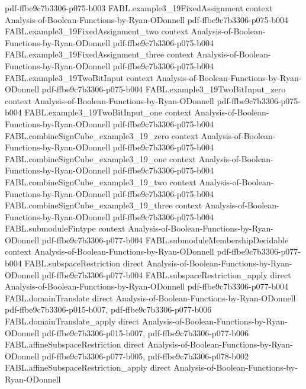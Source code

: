 \begin{theorem}
  {pdf-ffbe9c7b3306-p075-b003}
\proofstep
  {FABL.example3_19FixedAssignment}
  {context}
  {Analysis-of-Boolean-Functions-by-Ryan-ODonnell}
  {pdf-ffbe9c7b3306-p075-b004}
\proofstep
  {FABL.example3_19FixedAssignment_two}
  {context}
  {Analysis-of-Boolean-Functions-by-Ryan-ODonnell}
  {pdf-ffbe9c7b3306-p075-b004}
\proofstep
  {FABL.example3_19FixedAssignment_three}
  {context}
  {Analysis-of-Boolean-Functions-by-Ryan-ODonnell}
  {pdf-ffbe9c7b3306-p075-b004}
\proofstep
  {FABL.example3_19TwoBitInput}
  {context}
  {Analysis-of-Boolean-Functions-by-Ryan-ODonnell}
  {pdf-ffbe9c7b3306-p075-b004}
\proofstep
  {FABL.example3_19TwoBitInput_zero}
  {context}
  {Analysis-of-Boolean-Functions-by-Ryan-ODonnell}
  {pdf-ffbe9c7b3306-p075-b004}
\proofstep
  {FABL.example3_19TwoBitInput_one}
  {context}
  {Analysis-of-Boolean-Functions-by-Ryan-ODonnell}
  {pdf-ffbe9c7b3306-p075-b004}
\proofstep
  {FABL.combineSignCube_example3_19_zero}
  {context}
  {Analysis-of-Boolean-Functions-by-Ryan-ODonnell}
  {pdf-ffbe9c7b3306-p075-b004}
\proofstep
  {FABL.combineSignCube_example3_19_one}
  {context}
  {Analysis-of-Boolean-Functions-by-Ryan-ODonnell}
  {pdf-ffbe9c7b3306-p075-b004}
\proofstep
  {FABL.combineSignCube_example3_19_two}
  {context}
  {Analysis-of-Boolean-Functions-by-Ryan-ODonnell}
  {pdf-ffbe9c7b3306-p075-b004}
\proofstep
  {FABL.combineSignCube_example3_19_three}
  {context}
  {Analysis-of-Boolean-Functions-by-Ryan-ODonnell}
  {pdf-ffbe9c7b3306-p075-b004}
\proofstep
  {FABL.submoduleFintype}
  {context}
  {Analysis-of-Boolean-Functions-by-Ryan-ODonnell}
  {pdf-ffbe9c7b3306-p077-b004}
\proofstep
  {FABL.submoduleMembershipDecidable}
  {context}
  {Analysis-of-Boolean-Functions-by-Ryan-ODonnell}
  {pdf-ffbe9c7b3306-p077-b004}
\proofstep
  {FABL.subspaceRestriction}
  {direct}
  {Analysis-of-Boolean-Functions-by-Ryan-ODonnell}
  {pdf-ffbe9c7b3306-p077-b004}
\proofstep
  {FABL.subspaceRestriction_apply}
  {direct}
  {Analysis-of-Boolean-Functions-by-Ryan-ODonnell}
  {pdf-ffbe9c7b3306-p077-b004}
\proofstep
  {FABL.domainTranslate}
  {direct}
  {Analysis-of-Boolean-Functions-by-Ryan-ODonnell}
  {pdf-ffbe9c7b3306-p015-b007,
    pdf-ffbe9c7b3306-p077-b006}
\proofstep
  {FABL.domainTranslate_apply}
  {direct}
  {Analysis-of-Boolean-Functions-by-Ryan-ODonnell}
  {pdf-ffbe9c7b3306-p015-b007,
    pdf-ffbe9c7b3306-p077-b006}
\proofstep
  {FABL.affineSubspaceRestriction}
  {direct}
  {Analysis-of-Boolean-Functions-by-Ryan-ODonnell}
  {pdf-ffbe9c7b3306-p077-b005,
    pdf-ffbe9c7b3306-p078-b002}
\proofstep
  {FABL.affineSubspaceRestriction_apply}
  {direct}
  {Analysis-of-Boolean-Functions-by-Ryan-ODonnell}

\end{theorem}
